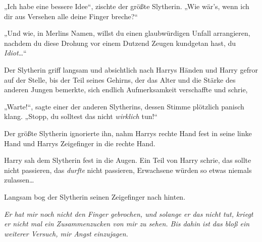 „Ich habe eine bessere Idee“, zischte der größte Slytherin. „Wie wär’s, wenn ich dir aus Versehen alle deine Finger breche?“

„Und wie, in Merlins Namen, willst du einen glaubwürdigen Unfall arrangieren, nachdem du diese Drohung vor einem Dutzend Zeugen kundgetan hast, du \emph{Idiot}…“

Der Slytherin griff langsam und absichtlich nach Harrys Händen und Harry gefror auf der Stelle, bis der Teil seines Gehirns, der das Alter und die Stärke des anderen Jungen bemerkte, sich endlich Aufmerksamkeit verschaffte und schrie, 

„Warte!“, sagte einer der anderen Slytherins, dessen Stimme plötzlich panisch klang. „Stopp, du solltest das nicht \emph{wirklich} tun!“

Der größte Slytherin ignorierte ihn, nahm Harrys rechte Hand fest in seine linke Hand und Harrys Zeigefinger in die rechte Hand.

Harry sah dem Slytherin fest in die Augen. Ein Teil von Harry schrie, das sollte nicht passieren, das \emph{durfte} nicht passieren, Erwachsene würden so etwas niemals zulassen…

Langsam bog der Slytherin seinen Zeigefinger nach hinten.

\emph{Er hat mir noch nicht den Finger gebrochen, und solange er das nicht tut, kriegt er nicht mal ein Zusammenzucken von mir zu sehen. Bis dahin ist das bloß ein weiterer Versuch, mir Angst einzujagen.}

